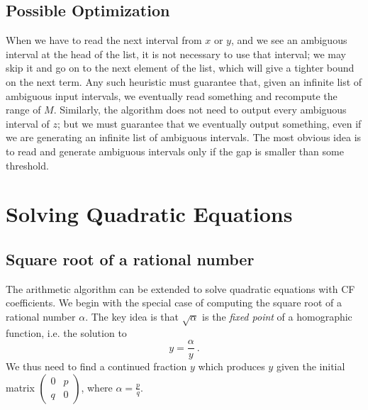 \documentclass[11pt, oneside]{amsart}   	%
\begin{document}
\subsection{Possible Optimization}
When we have to read the next interval from $x$ or $y$, and we see an ambiguous interval at the head of the list, it is not necessary
to use that interval; we may skip it and go on to the next element of the list, which will give a tighter bound on the next term.
Any such heuristic must guarantee that, given an infinite list of ambiguous input intervals, we eventually read something
and recompute the range of $M$. Similarly, the
algorithm does not need to output every ambiguous interval of $z$; but  we must guarantee that we eventually output something,
even if we are generating an infinite list of ambiguous intervals. The most obvious idea is to read and generate ambiguous intervals only if the gap is smaller than some threshold.


\section{Solving Quadratic Equations}
\subsection{Square root of a rational number}
The arithmetic algorithm can be extended to solve quadratic equations with CF coefficients.
We begin with the special case of computing the square root of a rational number $\alpha$. 
The key idea is that $\sqrt{\alpha}$ is the \emph{fixed point} of a homographic function, i.e. the solution to
\[
y = \frac{\alpha}{y}\ .
\]
We thus need to find a continued fraction $y$ which produces $y$ given the initial matrix
$\left(\begin{smallmatrix}
0 & p \\
q & 0
\end{smallmatrix}\right)$, where $\alpha = \frac{p}{q}$.
\end{document}
